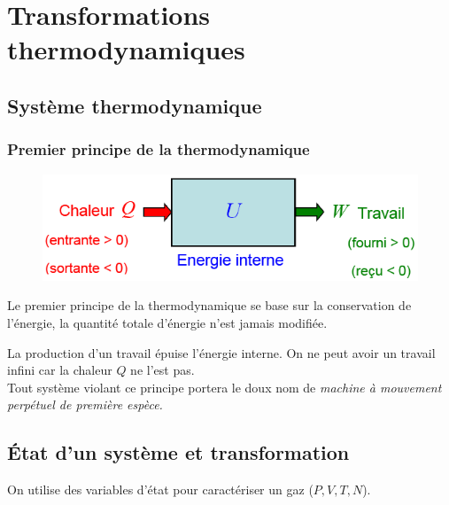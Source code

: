 \documentclass	[11pt, a4paper, openany]{book}
\begin{document}
\section{Transformations thermodynamiques}
\subsection{Système thermodynamique}
\subsubsection{Premier principe de la thermodynamique}
\begin{figure}
\includegraphics[scale=0.4]{th/image9.png}
\end{figure}
Le premier principe de la thermodynamique se base sur la conservation de l'énergie, la quantité totale d'énergie n'est jamais modifiée.\\
\begin{center}
\end{center}
La production d'un travail épuise l'énergie interne. On ne peut avoir un travail infini car la chaleur $Q$ ne l'est pas.\\
Tout système violant ce principe portera le doux nom de \textit{machine à mouvement perpétuel de première espèce.}

\subsection{État d'un système et transformation}
On utilise des variables d'état pour caractériser un gaz ($P, V, T, N$).
\end{document}
